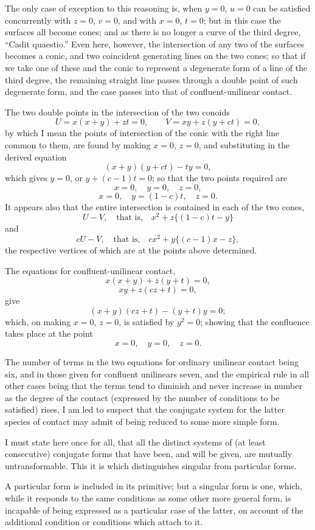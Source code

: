 \documentclass[11pt]{article}
\newcommand{\sourcepage}[1]{\marginpar{\scriptsize p.~#1}}
\begin{document}
{{The only case of exception to this reasoning is, when $y=0$, $u=0$ can be satisfied concurrently with $z=0$, $v=0$, and with $x=0$, $t=0$; but in this case the surfaces all become cones; and as there is no longer a curve of the third degree, ``Cadit quaestio.'' Even here, however, the intersection of any two of the surfaces becomes a conic, and two coincident generating lines on the two cones; so that if we take one of these and the conic to represent a degenerate form of a line of the third degree, the remaining straight line passes through a double point of such degenerate form, and the case passes into that of confluent-unilinear contact.

The two double points in the intersection of the two conoids
\[
U=x(x+y)+zt=0,
\qquad
V=xy+z(y+ct)=0,
\]
by which I mean the points of intersection of the conic with the right line common to them, are found by making $x=0$, $z=0$, and substituting in the derived equation
\[
(x+y)(y+ct)-ty=0,
\]
which gives $y=0$, or $y+(c-1)t=0$; so that the two points required are
\[
x=0,
\quad y=0,
\quad z=0,
\]
\[
x=0,
\quad y=(1-c)t,
\quad z=0.
\]
It appears also that the entire intersection is contained in each of the two cones,
\[
U-V,\quad \text{that is,}\quad x^2+z\{(1-c)t-y\}
\]
and
\[
cU-V,\quad \text{that is,}\quad cx^2+y\{(c-1)x-z\},
\]
the respective vertices of which are at the points above determined.

\sourcepage{230}
The equations for confluent-unilinear contact,
\[
x(x+y)+z(y+t)=0,
\]
\[
xy+z(cz+t)=0,
\]
give
\[
(x+y)(cz+t)-(y+t)y=0;
\]
which, on making $x=0$, $z=0$, is satisfied by $y^2=0$; showing that the confluence takes place at the point
\[
x=0,
\quad y=0,
\quad z=0.
\]

The number of terms in the two equations for ordinary unilinear contact being six, and in those given for confluent unilinears seven, and the empirical rule in all other cases being that the terms tend to diminish and never increase in number as the degree of the contact (expressed by the number of conditions to be satisfied) rises, I am led to suspect that the conjugate system for the latter species of contact may admit of being reduced to some more simple form.

I must state here once for all, that all the distinct systems of (at least consecutive) conjugate forms that have been, and will be given, are mutually untransformable. This it is which distinguishes singular from particular forms.

A particular form is included in its primitive; but a singular form is one, which, while it responds to the same conditions as some other more general form, is incapable of being expressed as a particular case of the latter, on account of the additional condition or conditions which attach to it.

}}
\end{document}
